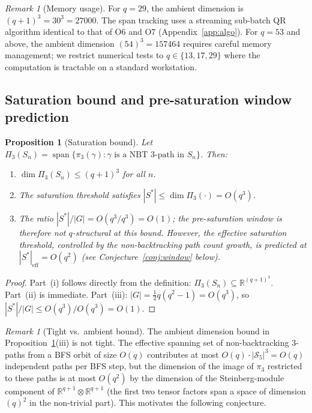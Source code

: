 \documentclass[11pt,a4paper]{article}
\newtheorem{proposition}[theorem]{Proposition}
\theoremstyle{definition}
\theoremstyle{remark}
\newtheorem{remark}[theorem]{Remark}
\DeclareMathOperator{\Span}{span}
\newcommand{\R}{\mathbb{R}}
\begin{document}
    \begin{remark}[Memory usage]
      \label{rem:memory}
      For $q = 29$, the ambient dimension is $(q+1)^3 = 30^3 = 27000$.
      The span tracking uses a streaming sub-batch QR algorithm identical to that
      of O6 and O7 (Appendix~\ref{app:algo}).
      For $q = 53$ and above, the ambient dimension $(54)^3 = 157464$ requires
      careful memory management; we restrict numerical tests to $q \in \{13, 17, 29\}$
      where the computation is tractable on a standard workstation.
    \end{remark}

  \subsection{Saturation bound and pre-saturation window prediction}
    \label{sec:fingerprint-sat}

    \begin{proposition}[Saturation bound]
      \label{prop:satbound}
      Let $\Pi_3(S_n) = \Span\{\pi_3(\gamma) : \gamma \text{ is a NBT 3-path in }S_n\}$.
      Then:
      \begin{enumerate}[label=(\roman*)]
  \item $\dim \Pi_3(S_n) \leq (q+1)^3$ for all $n$.
  \item The saturation threshold satisfies $|S^*| \leq \dim \Pi_3(\cdot) = O(q^3)$.
  \item The ratio $|S^*|/|G| = O(q^3/q^3) = O(1)$; the pre-saturation window is
  therefore not $q$-structural at this bound.
  However, the \emph{effective} saturation threshold, controlled by the
  non-backtracking path count growth, is predicted at $|S^*|_\mathrm{eff} = O(q^2)$
  (see Conjecture~\ref{conj:window} below).
      \end{enumerate}
    \end{proposition}

    \begin{proof}
      Part~(i) follows directly from the definition: $\Pi_3(S_n) \subseteq \R^{(q+1)^3}$.
      Part~(ii) is immediate.
      Part~(iii): $|G| = \frac{1}{2}q(q^2-1) = O(q^3)$, so
      $|S^*|/|G| \leq O(q^3)/O(q^3) = O(1)$.
    \end{proof}

    \begin{remark}[Tight vs.\ ambient bound]
      \label{rem:tight-bound}
      The ambient dimension bound in Proposition~\ref{prop:satbound}(iii) is not tight.
      The effective spanning set of non-backtracking 3-paths from a BFS orbit of size
      $O(q)$ contributes at most $O(q) \cdot |\mathcal{S}_5|^3 = O(q)$ independent paths
      per BFS step, but the dimension of the image of $\pi_3$ restricted to these paths
      is at most $O(q^2)$ by the dimension of the Steinberg-module component of
      $\R^{q+1} \otimes \R^{q+1}$ (the first two tensor factors span a space of dimension
      $(q)^2$ in the non-trivial part).
      This motivates the following conjecture.
    \end{remark}
\end{document}

